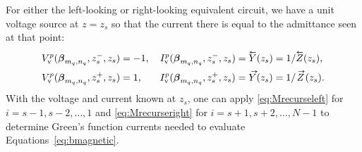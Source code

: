 For either the left-looking or right-looking equivalent circuit, 
we have a unit voltage source at $z=z_s$ so that the
current there is equal to the admittance seen at that point:
\begin{subequations}
\begin{align}
  \Vv^{p}(\vecbeta_{m_q,n_q},z_s^-,z_s) &= -1, \quad
  \Iv^{p}(\vecbeta_{m_q,n_q},z_s^-,z_s) = \Yleft(z_s) = 1/\Zleft(z_s), \\
  \Vv^{p}(\vecbeta_{m_q,n_q},z_s^+,z_s) &= 1, \quad \hphantom{-}
  \Iv^{p}(\vecbeta_{m_q,n_q},z_s^+,z_s) = \Yright(z_s) = 1/\Zright(z_s).
\end{align}
\end{subequations}
With the voltage and current known at $z_s$, one can apply 
\eqref{eq:Mrecurseleft} for $i=s-1, s-2, \ldots, 1$ and 
\eqref{eq:Mrecurseright} for $i=s+1, s+2, \ldots, N-1$ to determine
Green's function currents needed to evaluate Equations~\eqref{eq:bmagnetic}.
  
